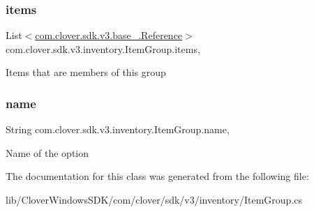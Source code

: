 \subsubsection{\texorpdfstring{items}{items}}
{\footnotesize\ttfamily List$<$\hyperlink{classcom_1_1clover_1_1sdk_1_1v3_1_1base___1_1_reference}{com.\+clover.\+sdk.\+v3.\+base\+\_\+.\+Reference}$>$ com.\+clover.\+sdk.\+v3.\+inventory.\+Item\+Group.\+items\hspace{0.3cm}{\ttfamily [get]}, {\ttfamily [set]}}



Items that are members of this group 

\mbox{\label{classcom_1_1clover_1_1sdk_1_1v3_1_1inventory_1_1_item_group_a9495378b9548b9b145ccd7b1c527f464}} 
\subsubsection{\texorpdfstring{name}{name}}
{\footnotesize\ttfamily String com.\+clover.\+sdk.\+v3.\+inventory.\+Item\+Group.\+name\hspace{0.3cm}{\ttfamily [get]}, {\ttfamily [set]}}



Name of the option 



The documentation for this class was generated from the following file\+:\begin{DoxyCompactItemize}
\item 
lib/\+Clover\+Windows\+S\+D\+K/com/clover/sdk/v3/inventory/Item\+Group.\+cs\end{DoxyCompactItemize}

